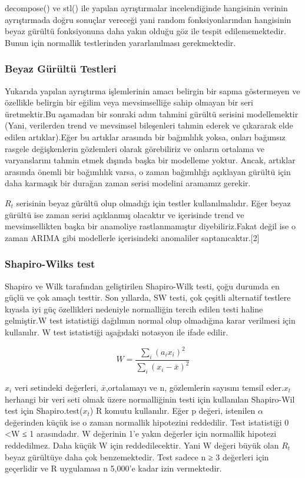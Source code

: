 \documentclass[11pt]{article}
\begin{document}
decompose() ve stl() ile yapılan ayrıştırmalar incelendiğinde hangisinin
verinin ayrıştırmada doğru sonuçlar vereceği yani random
fonksiyonlarından hangisinin beyaz gürültü fonksiyonuna daha yakın
olduğu göz ile tespit edilememektedir. Bunun için normallik testlerinden
yararlanılması gerekmektedir.

\subsubsection{Beyaz Gürültü
Testleri}\label{beyaz-guxfcruxfcltuxfc-testleri}

Yukarıda yapılan ayrıştırma işlemlerinin amacı belirgin bir sapma
göstermeyen ve özellikle belirgin bir eğilim veya mevsimselliğe sahip
olmayan bir seri üretmektir.Bu aşamadan bir sonraki adım tahmini gürültü
serisini modellemektir (Yani, verilerden trend ve mevsimsel bileşenleri
tahmin ederek ve çıkararak elde edilen artıklar).Eğer bu artıklar
arasında bir bağımlılık yoksa, onları bağımsız rasgele değişkenlerin
gözlemleri olarak görebiliriz ve onların ortalama ve varyanslarını
tahmin etmek dışında başka bir modelleme yoktur. Ancak, artıklar
arasında önemli bir bağımlılık varsa, o zaman bağımlılığı açıklayan
gürültü için daha karmaşık bir durağan zaman serisi modelini aramamız
gerekir.

\(R_t\) serisinin beyaz gürültü olup olmadığı için testler
kullanılmalıdır. Eğer beyaz gürültü ise zaman serisi açıklanmış
olacaktır ve içerisinde trend ve mevsimsellikten başka bir anamoliye
rastlanmamıştır diyebiliriz.Fakat değil ise o zaman ARIMA gibi
modellerle içerisindeki anomaliler saptanıcaktır.{[}2{]}

\subsubsection{Shapiro-Wilks test}\label{shapiro-wilks-test}

Shapiro ve Wilk tarafından geliştirilen Shapiro-Wilk testi, çoğu durumda
en güçlü ve çok amaçlı testtir. Son yıllarda, SW testi, çok çeşitli
alternatif testlere kıyasla iyi güç özellikleri nedeniyle normalliğin
tercih edilen testi haline gelmiştir.W test istatistiği dağılımın normal
olup olmadığına karar verilmesi için kullanılır. W test istatistiği
aşağıdaki notasyon ile ifade edilir.

\[W=\frac{\sum_i(a_ix_i)^2}{\sum_i(x_i-\bar{x})^2}\]

\(x_i\) veri setindeki değerleri, \(\bar{x}\),ortalamayı ve n,
gözlemlerin sayısını temsil eder.\({x_t}\) herhangi bir veri seti olmak
üzere normalliğinin testi için kullanılan Shapiro-Wil test için
Shapiro.test(\(x_t\)) R komutu kullanılır. Eğer p değeri, istenilen
\(\alpha\) değerinden küçük ise o zaman normallik hipotezini reddedilir.
Test istatistiği 0 \textless{}W ≤ 1 arasındadır. W değerinin 1'e yakın
değerler için normallik hipotezi reddedilmez. Daha küçük W için
reddedilecektir. Yani W değeri büyük olan \(R_t\) beyaz gürültüye daha
çok benzemektedir. Test sadece n ≥ 3 değerleri için geçerlidir ve R
uygulaması n 5,000'e kadar izin vermektedir.
\end{document}
